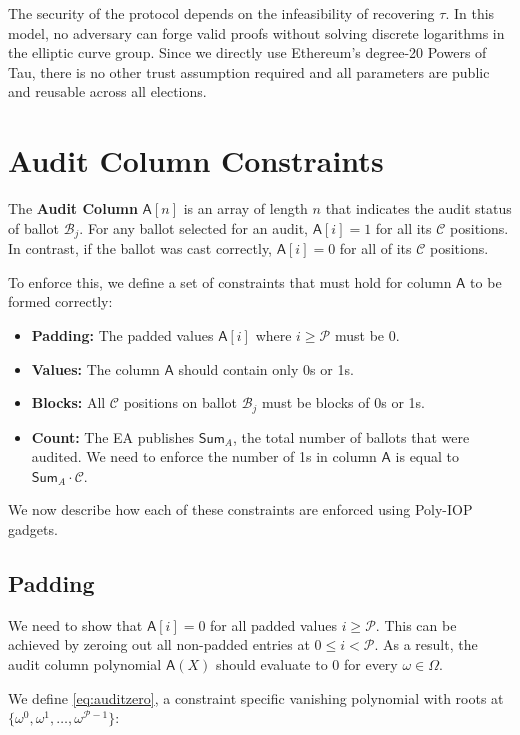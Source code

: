 The security of the protocol depends on the infeasibility of recovering $\tau$. In this model, no adversary can forge valid proofs without solving discrete logarithms in the elliptic curve group. 
Since we directly use Ethereum's degree-20 Powers of Tau, there is no other trust assumption required and all parameters are public and reusable across all elections.

\section{Audit Column Constraints}
The \textbf{Audit Column} $\mathsf{A}[n]$ is an array of length $n$ that indicates the audit status of ballot $\mathcal{B}_j$.  
For any ballot selected for an audit, $\mathsf{A}[i]=1$ for all its $\mathcal{C}$ positions. In contrast, if the ballot was cast correctly, $\mathsf{A}[i]=0$ for all of its $\mathcal{C}$ positions.

To enforce this, we define a set of constraints that must hold for column $\mathsf{A}$ to be formed correctly:
\begin{itemize}
  \item \textbf{Padding:} The padded values $\mathsf{A}[i]$ where $i \ge \mathcal{P}$ must be 0.
  \item \textbf{Values:} The column $\mathsf{A}$ should contain only 0s or 1s.
  \item \textbf{Blocks:} All $\mathcal{C}$ positions on ballot $\mathcal{B}_j$ must be blocks of 0s or 1s.
  \item \textbf{Count:} The EA publishes $\mathsf{Sum}_A$, the total number of ballots that were audited. We need to enforce the number of 1s in column $\mathsf{A}$ is equal to $\mathsf{Sum}_A \cdot \mathcal{C}$.
\end{itemize}

We now describe how each of these constraints are enforced using Poly-IOP gadgets.

\subsection{Padding}
\label{subsec:padding}
We need to show that $\mathsf{A}[i]=0$ for all padded values $i\ge \mathcal{P}$. This can be achieved by zeroing out all non-padded entries at $0\le i < \mathcal{P}$. As a result, the audit column polynomial $\mathsf{A}(X)$ should evaluate to 0 for every $\omega\in\Omega$.

We define \ref{eq:auditzero}, a constraint specific vanishing polynomial 
with roots at \newline $\{\omega^0, \omega^1, \dots, \omega^{\mathcal{P}-1}\}$:

